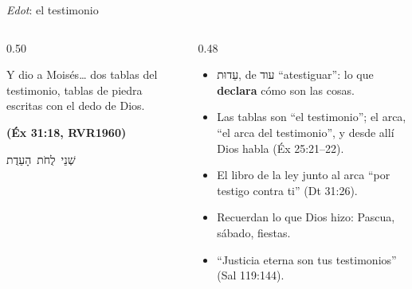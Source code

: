 \documentclass[hyperref={bookmarks=false},aspectratio=169]{beamer}
\newcommand{\heb}[1]{\mbox{\foreignlanguage{hebrew}{#1}}}
\newcommand{\fuente}[1]{\par\hfill{\upshape\bfseries\footnotesize\textcolor{azul}{#1}}}
\newcommand{\destacar}[1]{\textbf{\textcolor{azul}{#1}}}
\begin{document}
\begin{frame}{\emph{Edot}: el testimonio}
\begin{columns}[c,onlytextwidth]
\begin{column}{0.50\textwidth}
\begin{cita}Y dio a Moisés\ldots{} dos tablas del testimonio, tablas de piedra escritas con el dedo de Dios.\fuente{(Éx 31:18, RVR1960)}\end{cita}
\begin{center}\heb{שְׁנֵי לֻחֹת הָעֵדֻת}\end{center}
\end{column}
\begin{column}{0.48\textwidth}\small
\begin{itemize}
\item \heb{עֵדוּת}, de \heb{עוד} ``atestiguar'': lo que \destacar{declara} cómo son las cosas.
\item Las tablas son ``el testimonio''; el arca, ``el arca del testimonio'', y desde allí Dios habla (Éx 25:21--22).
\item El libro de la ley junto al arca ``por testigo contra ti'' (Dt 31:26).
\item Recuerdan lo que Dios hizo: Pascua, sábado, fiestas.
\item ``Justicia eterna son tus testimonios'' (Sal 119:144).
\end{itemize}
\end{column}
\end{columns}
\end{frame}
\end{document}
